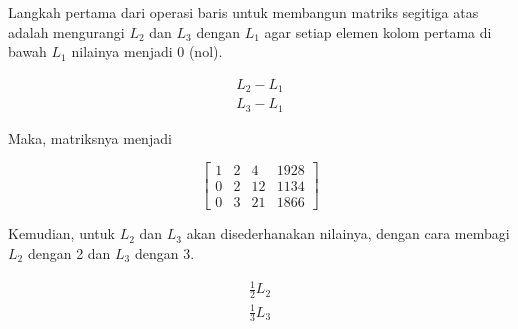 Langkah pertama dari operasi baris untuk membangun matriks segitiga atas adalah mengurangi \begin{math}L_2\end{math} dan \begin{math}L_3\end{math} dengan \begin{math}L_1\end{math} agar setiap elemen kolom pertama di bawah \begin{math}L_1\end{math} nilainya menjadi 0 (nol).

\begin{center}
	\begin{gather*}
		L_2 - L_1	\\
		L_3 - L_1
	\end{gather*}
\end{center}

\begin{flushleft}
	Maka, matriksnya menjadi
\end{flushleft}

\begin{center}
	\setlength\arraycolsep{15pt}
	\[
	\begin{bmatrix}
			1 & 	2 & 	4  & 	1928 \\[1em]
			0 & 	2 & 	12 & 	1134 \\[1em]
			0 & 	3 & 	21 & 	1866
	\end{bmatrix}
	\]
\end{center}

\begin{flushleft}
	Kemudian, untuk \begin{math}L_2\end{math} dan \begin{math}L_3\end{math} akan disederhanakan nilainya, dengan cara membagi \begin{math}L_2\end{math} dengan 2 dan \begin{math}L_3\end{math} dengan 3.
\end{flushleft}

\begin{center}
	\begin{gather*}
		\frac{1}{2}L_2	\\
		\frac{1}{3}L_3
	\end{gather*}
\end{center}

